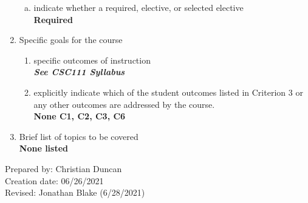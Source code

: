 \begin{enumerate}[1.]
\begin{enumerate}[a.]
\item indicate whether a required, elective, or selected elective\\ %
  {\bfseries
    Required
  }

\end{enumerate}

\item Specific goals for the course
\begin{enumerate}
\item specific outcomes of instruction\\ %
  {\bfseries
    \emph{See CSC111 Syllabus}
  }

\item explicitly indicate which of the student outcomes listed in Criterion 3 or any other outcomes are addressed by the course.\\
  {\bfseries
    None
    C1,
    C2,
    C3,
    C6
  }
\end{enumerate}

\item Brief list of topics to be covered\\
  {\bfseries
  None listed
  }

\end{enumerate}

\noindent Prepared by: Christian Duncan\\
\noindent Creation date: 06/26/2021\\
\noindent Revised: Jonathan Blake (6/28/2021)\\
